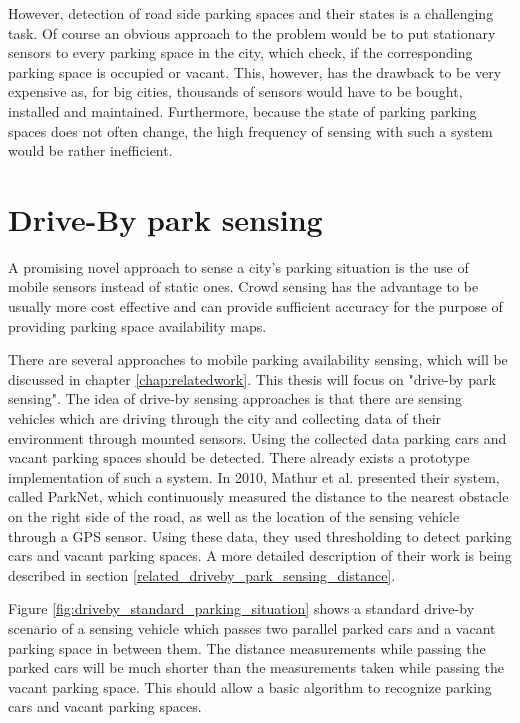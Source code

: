 However, detection of road side parking spaces and their states is a challenging task. Of course an obvious approach to the problem would be to put stationary sensors to every parking space in the city, which check, if the corresponding parking space is occupied or vacant. This, however, has the drawback to be very expensive as, for big cities, thousands of sensors would have to be bought, installed and maintained. Furthermore, because the state of parking parking spaces does not often change, the high frequency of sensing with such a system would be rather inefficient.





\section{Drive-By park sensing}

A promising novel approach to sense a city's parking situation is the use of mobile sensors instead of static ones. Crowd sensing has the advantage to be usually more cost effective and can provide sufficient accuracy for the purpose of providing parking space availability maps.

There are several approaches to mobile parking availability sensing, which will be discussed in chapter \ref{chap:relatedwork}. This thesis will focus on "drive-by park sensing". The idea of drive-by sensing approaches is that there are sensing vehicles which are driving through the city and collecting data of their environment through mounted sensors. Using the collected data parking cars and vacant parking spaces should be detected. There already exists a prototype implementation of such a system. In 2010, Mathur et al. \cite{Mathur:2010:PDS:1814433.1814448} presented their system, called ParkNet, which continuously measured the distance to the nearest obstacle on the right side of the road, as well as the location of the sensing vehicle through a GPS sensor. Using these data, they used thresholding to detect parking cars and vacant parking spaces. A more detailed description of their work is being described in section \ref{related_driveby_park_sensing_distance}.

Figure \ref{fig:driveby_standard_parking_situation} shows a standard drive-by scenario of a sensing vehicle which passes two parallel parked cars and a vacant parking space in between them. The distance measurements while passing the parked cars will be much shorter than the measurements taken while passing the vacant parking space. This should allow a basic algorithm to recognize parking cars and vacant parking spaces.

